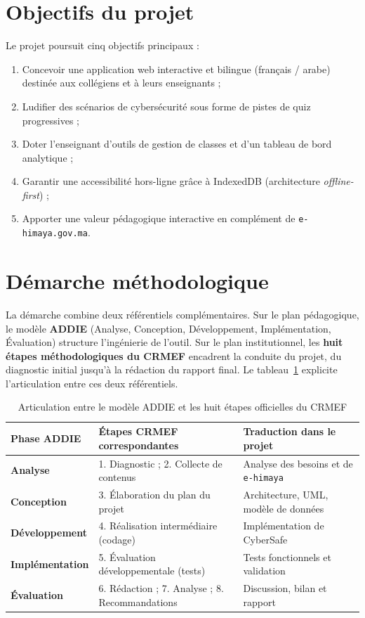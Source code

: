\documentclass[12pt, a4paper, oneside]{report}
\begin{document}
\section*{Objectifs du projet}
Le projet poursuit cinq objectifs principaux :
\begin{enumerate}[leftmargin=*]
  \item Concevoir une application web interactive et bilingue (français / arabe) destinée aux collégiens et à leurs enseignants ;
  \item Ludifier des scénarios de cybersécurité sous forme de pistes de quiz progressives ;
  \item Doter l'enseignant d'outils de gestion de classes et d'un tableau de bord analytique ;
  \item Garantir une accessibilité hors-ligne grâce à IndexedDB (architecture \textit{offline-first}) ;
  \item Apporter une valeur pédagogique interactive en complément de \texttt{e-himaya.gov.ma}.
\end{enumerate}

\section*{Démarche méthodologique}
La démarche combine deux référentiels complémentaires. Sur le plan pédagogique, le modèle \textbf{ADDIE} (Analyse, Conception, Développement, Implémentation, Évaluation) structure l'ingénierie de l'outil. Sur le plan institutionnel, les \textbf{huit étapes méthodologiques du CRMEF} encadrent la conduite du projet, du diagnostic initial jusqu'à la rédaction du rapport final. Le tableau~\ref{tab:addiecrmef} explicite l'articulation entre ces deux référentiels.

\begin{table}[H]
\centering
\caption{Articulation entre le modèle ADDIE et les huit étapes officielles du CRMEF}
\label{tab:addiecrmef}
\begin{tabularx}{\textwidth}{@{}>{\bfseries}l X X@{}}
\toprule
Phase ADDIE & Étapes CRMEF correspondantes & Traduction dans le projet \\
\midrule
Analyse & 1. Diagnostic ; 2. Collecte de contenus & Analyse des besoins et de \texttt{e-himaya} \\
Conception & 3. Élaboration du plan du projet & Architecture, UML, modèle de données \\
Développement & 4. Réalisation intermédiaire (codage) & Implémentation de CyberSafe \\
Implémentation & 5. Évaluation développementale (tests) & Tests fonctionnels et validation \\
Évaluation & 6. Rédaction ; 7. Analyse ; 8. Recommandations & Discussion, bilan et rapport \\
\bottomrule
\end{tabularx}
\end{table}
\end{document}
